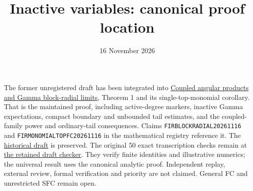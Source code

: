 \documentclass[11pt]{article}
\title{Inactive variables: canonical proof location}
\date{16 November 2026}
\begin{document}
\maketitle
The former unregistered draft has been integrated into
\href{../factorial-image-rigidity/COUPLED_BLOCK_PERIODS.tex}
{Coupled angular products and Gamma block-radial limits},
Theorem 1 and its single-top-monomial corollary. That is the maintained
proof, including active-degree markers, inactive Gamma expectations,
compact boundary and unbounded tail estimates, and the coupled-family
power and ordinary-tail consequences. Claims
\texttt{FIRBLOCKRADIAL20261116} and
\texttt{FIRMONOMIALTOPFC20261116} in the mathematical registry reference it.
The \href{../../archive/non-elliptic/factorial-image-rigidity/INACTIVE_VARIABLE_FACTORIAL_EXTENSION_2026_11_16_DRAFT.tex}{historical draft} is preserved.
The original 50 exact transcription checks remain at
\href{check_inactive_variable_factorial_extension_20261116.py}
{the retained draft checker}. They verify finite identities and illustrative
numerics; the universal result uses the canonical analytic proof.
Independent replay, external review, formal verification and priority
are not claimed. General FC and unrestricted SFC remain open.
\end{document}
